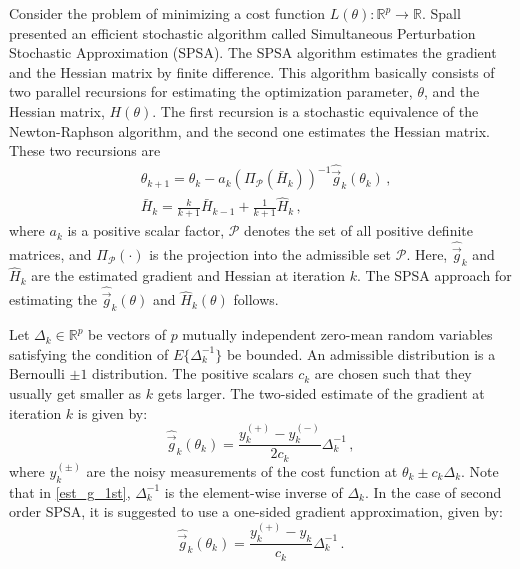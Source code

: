 Consider the problem of minimizing a cost function $L(\theta): \mathbb{R}^p \rightarrow \mathbb{R}$. Spall \cite{spall1992multivariate,spall2000adaptive,spall2009feedback} presented an efficient stochastic algorithm called Simultaneous Perturbation Stochastic Approximation (SPSA). The SPSA algorithm estimates the gradient and the Hessian matrix by finite difference. This algorithm basically consists of two parallel recursions for estimating the optimization parameter, $\theta$, and the Hessian matrix, $H(\theta)$. The first recursion is a stochastic equivalence of the Newton-Raphson algorithm, and the second one estimates the Hessian matrix. These two recursions are
\begin{equation} \label{spsa2}
\begin{aligned}
	&\theta_{k+1} = \theta_{k} - a_k \left( \Pi_{\mathcal{P}}  (\bar{H}_k)  \right)^{-1} \hat{\vec{g}}_k(\theta_k) \,, \\
	&\bar{H}_k =  \frac{k}{k+1} \bar{H}_{k-1} + \frac{1}{k+1} \hat{H}_{k} \,, %
\end{aligned}
\end{equation}
where $a_k$ is a positive scalar factor, $\mathcal{P}$ denotes the set of all positive definite matrices, and $\Pi_{\mathcal{P}} (\cdot)$ is the projection into the admissible set $\mathcal{P}$. Here, $\hat{\vec{g}}_k$ and $\hat{H}_{k}$ are the estimated gradient and Hessian at iteration $k$. The SPSA approach for estimating the $\hat{\vec{g}}_k(\theta)$ and $\hat{H}_k(\theta)$ follows.

Let $\Delta_k \in \mathbb{R}^p$ be vectors of $p$ mutually independent zero-mean random variables satisfying the condition of $E\{\Delta_k^{-1} \}$ be bounded. An admissible distribution is a Bernoulli $\pm 1$ distribution. The positive scalars $c_k$ are chosen such that they usually get smaller as $k$ gets larger. The two-sided estimate of the gradient at iteration $k$ is given by:
\begin{equation} \label{est_g_1st}
	\hat{\vec{g}}_k(\theta_k) =  \frac{y_k^{(+)} - y_k^{(-)} }{2c_k} \Delta_k^{-1} \,, 
\end{equation}
where $y_k^{(\pm)}$ are the noisy measurements of the cost function at $\theta_k \pm c_k \Delta_k$. Note that in \eqref{est_g_1st}, $\Delta_k^{-1}$ is the element-wise inverse of $\Delta_k$. In the case of second order SPSA, it is suggested to use a one-sided gradient approximation, given by:
\begin{equation} \label{est_g_1sided}
	\hat{\vec{g}}_k(\theta_k) =  \frac{y_k^{(+)} - y_k }{c_k} \Delta_k^{-1} \,.
\end{equation}

